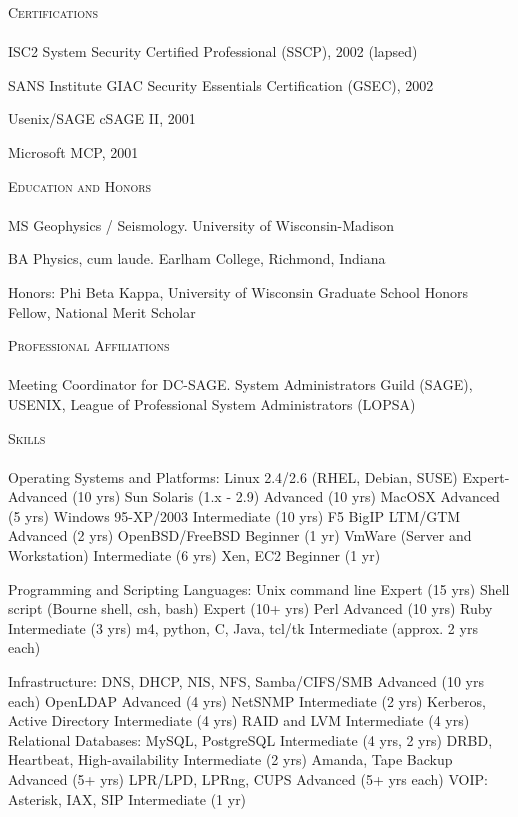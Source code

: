 \documentclass{article}
\newcommand{\lineunder}{\vspace*{-8pt} \\ \hspace*{-18pt} \hrulefill \\}
\newcommand{\header}[1]{{\hspace*{-15pt}\vspace*{6pt} \textsc{#1}} \vspace*{-6pt} \lineunder}
\newenvironment{achievements}{\begin{list}{$\bullet$}{\topsep 0pt \itemsep -2pt}}{\vspace*{4pt}\end{list}}
\begin{document}
\header{Certifications}
ISC2 System Security Certified Professional (SSCP), 2002 (lapsed)

SANS Institute GIAC Security Essentials Certification (GSEC), 2002

Usenix/SAGE cSAGE II, 2001

Microsoft MCP, 2001



\header{Education and Honors}

MS Geophysics / Seismology.  University of Wisconsin-Madison

BA Physics, cum laude. Earlham College, Richmond, Indiana

Honors: Phi Beta Kappa, University of Wisconsin Graduate School Honors Fellow, National Merit Scholar

\header{Professional Affiliations}
Meeting Coordinator for DC-SAGE.  
System Administrators Guild (SAGE), USENIX, League of Professional System Administrators (LOPSA) 


\header{Skills}
Operating Systems and Platforms: 
   Linux 2.4/2.6 (RHEL, Debian, SUSE)        Expert-Advanced (10 yrs)
   Sun Solaris (1.x - 2.9)                   Advanced (10 yrs)
   MacOSX                                    Advanced (5 yrs)
   Windows 95-XP/2003                        Intermediate (10 yrs)
   F5 BigIP LTM/GTM                          Advanced (2 yrs)
   OpenBSD/FreeBSD                           Beginner (1 yr)
   VmWare (Server and Workstation)           Intermediate (6 yrs)
   Xen, EC2                                  Beginner (1 yr)
    
Programming and Scripting Languages: 
   Unix command line                         Expert (15 yrs)
   Shell script (Bourne shell, csh, bash)    Expert (10+ yrs)
   Perl                                      Advanced (10 yrs)
   Ruby                                      Intermediate (3 yrs)
   m4, python, C, Java, tcl/tk               Intermediate (approx. 2 yrs each)

Infrastructure: 
   DNS, DHCP, NIS, NFS, Samba/CIFS/SMB       Advanced (10 yrs each)
   OpenLDAP                                  Advanced (4 yrs)
   NetSNMP                                   Intermediate (2 yrs)
   Kerberos, Active Directory                Intermediate (4 yrs)
   RAID and LVM                              Intermediate (4 yrs)
   Relational Databases: MySQL, PostgreSQL   Intermediate (4 yrs, 2 yrs)
   DRBD, Heartbeat, High-availability        Intermediate (2 yrs)
   Amanda, Tape Backup                       Advanced (5+ yrs)
   LPR/LPD, LPRng, CUPS                      Advanced (5+ yrs each)
   VOIP: Asterisk, IAX, SIP                  Intermediate (1 yr)
   
\end{document}
